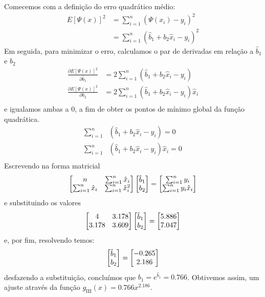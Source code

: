 \documentclass{homework}
\begin{document}
	Comecemos com a definição do erro quadrático médio:
		\begin{align*}
		E[\varPsi(x)]^2 &= \sum_{i = 1}^{n} (\varPsi(x_i) - y_i)^2\\
						&= \sum_{i = 1}^{n} (\hat{b}_1 + b_2 \hat{x}_i - y_i)^2
		\end{align*}
	Em seguida, para minimizar o erro, calculamos o par de derivadas em relação a $\hat{b}_1 $ e $b_2$
		\begin{align*}
		\frac{\partial E[\varPsi(x)]^2}{\partial \hat{b}_1} &= 2 \sum_{i = 1}^{n} (\hat{b}_1 + b_2 \hat{x}_i - y_i)\\
		\frac{\partial E[\varPsi(x)]^2}{\partial b_2} &= 2 \sum_{i = 1}^{n} (\hat{b}_1 + b_2 \hat{x}_i - y_i) \hat{x}_i\\
		\end{align*}%
	e igualamos ambas a $0$, a fim de obter os pontos de mínimo global da função quadrática.
		\begin{align*}
		\sum_{i = 1}^{n}& (\hat{b}_1 + b_2 \hat{x}_i - y_i) = 0\\
		\sum_{i = 1}^{n}& (\hat{b}_1 + b_2 \hat{x}_i - y_i) \hat{x}_i = 0\\
		\end{align*}%
	Escrevendo na forma matricial
		$$ \left[\begin{array}{@{}cc@{}} %
		n & \sum_{i = 1}^{n} \hat{x}_i\\
		\sum_{i = 1}^{n} \hat{x}_i & \sum_{i = 1}^{n} \hat{x}_i^2 \\
		\end{array}\right]%
		\left[\begin{array}{@{}c@{}} %
		\hat{b}_1\\
		b_2
		\end{array}\right]
		=		
		\left[\begin{array}{@{}c@{}} %
		\sum_{i = 1}^{n} y_i\\
		\sum_{i = 1}^{n} y_i \hat{x}_i
		\end{array}\right]
		$$
	e substituindo os valores
		$$ \left[\begin{array}{@{}cc@{}} %
		4 & 3.178\\
		3.178 & 3.609 \\
		\end{array}\right]%
		\left[\begin{array}{@{}c@{}} %
		\hat{b}_1\\
		b_2
		\end{array}\right]
		=		
		\left[\begin{array}{@{}c@{}} %
		5.886\\
		7.047
		\end{array}\right]
		$$
	e, por fim, resolvendo temos:
		$$
		\left[\begin{array}{@{}c@{}} %
			\hat{b}_1\\
			b_2
		\end{array}\right]
		=		
		\left[\begin{array}{@{}c@{}} %
			-0.265\\
			2.186
		\end{array}\right]
		$$
	desfazendo a substituição, concluímos que $b_1 = e^{\hat{b}_1} = 0.766$. Obtivemos assim, um ajuste através da função $g_\text{III}(x) = 0.766 x^{2.186}$.
	
\end{document}
